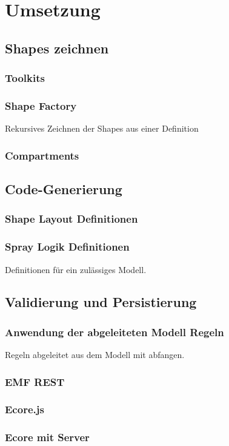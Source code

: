 \section{Umsetzung}


\subsection{Shapes zeichnen}

\subsubsection{Toolkits}

\subsubsection{\dd}

\citep{dd}

\subsubsection{Shape Factory}

Rekursives Zeichnen der Shapes aus einer Definition

\subsubsection{Compartments}


\subsection{Code-Generierung}

\subsubsection{Shape Layout Definitionen}

\subsubsection{Spray Logik Definitionen}

Definitionen für ein zulässiges Modell.

\subsection{Validierung und Persistierung}

\subsubsection{Anwendung der abgeleiteten Modell Regeln}

Regeln abgeleitet aus dem Modell mit \dd abfangen.

\subsubsection{EMF REST}

\subsubsection{Ecore.js}

\subsubsection{Ecore mit Server}

